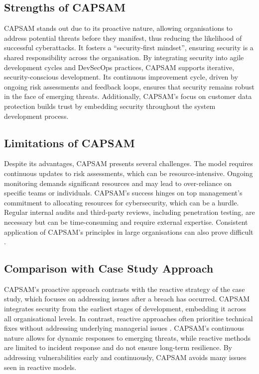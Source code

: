     \subsection{Strengths of CAPSAM}
    CAPSAM stands out due to its proactive nature, allowing organisations to address potential threats before they manifest, thus reducing the likelihood of successful cyberattacks. It fosters a ``security-first mindset'', ensuring security is a shared responsibility across the organisation. By integrating security into agile development cycles and DevSecOps practices, CAPSAM supports iterative, security-conscious development. Its continuous improvement cycle, driven by ongoing risk assessments and feedback loops, ensures that security remains robust in the face of emerging threats. Additionally, CAPSAM's focus on customer data protection builds trust by embedding security throughout the system development process.

    \subsection{Limitations of CAPSAM}
    Despite its advantages, CAPSAM presents several challenges. The model requires continuous updates to risk assessments, which can be resource-intensive. Ongoing monitoring demands significant resources and may lead to over-reliance on specific teams or individuals. CAPSAM's success hinges on top management's commitment to allocating resources for cybersecurity, which can be a hurdle. Regular internal audits and third-party reviews, including penetration testing, are necessary but can be time-consuming and require external expertise. Consistent application of CAPSAM's principles in large organisations can also prove difficult \citep{purdy2010iso}.

    \subsection{Comparison with Case Study Approach}
    CAPSAM's proactive approach contrasts with the reactive strategy of the case study, which focuses on addressing issues after a breach has occurred. CAPSAM integrates security from the earliest stages of development, embedding it across all organisational levels. In contrast, reactive approaches often prioritise technical fixes without addressing underlying managerial issues \citep{shedden2010information, shaikh2023information}. CAPSAM's continuous nature allows for dynamic responses to emerging threats, while reactive methods are limited to incident response and do not ensure long-term resilience. By addressing vulnerabilities early and continuously, CAPSAM avoids many issues seen in reactive models.

